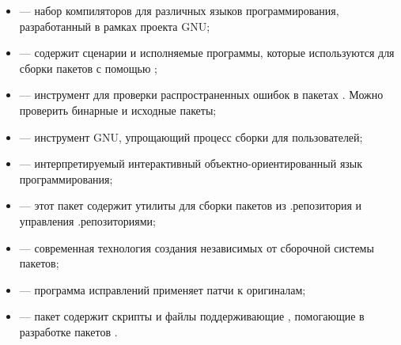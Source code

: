 \begin{itemize}
	\item {} --- набор компиляторов для различных языков программирования, разработанный в рамках проекта GNU;
	\item {} --- содержит сценарии и исполняемые программы, которые используются для сборки пакетов с помощью ;
	\item {} --- инструмент для проверки распространенных ошибок в пакетах . Можно проверить бинарные и исходные пакеты;
	\item {} --- инструмент GNU, упрощающий процесс сборки для пользователей;
	\item {} --- интерпретируемый интерактивный объектно-ориентированный язык программирования;
	\item {} --- этот пакет содержит утилиты для сборки пакетов  из .репозитория и управления .репозиториями;
	\item {} --- современная технология создания независимых от сборочной системы пакетов;
	\item {} --- программа исправлений применяет патчи к оригиналам;
	\item {} --- пакет содержит скрипты и файлы поддерживающие , помогающие в разработке пакетов .
	\end{itemize}


